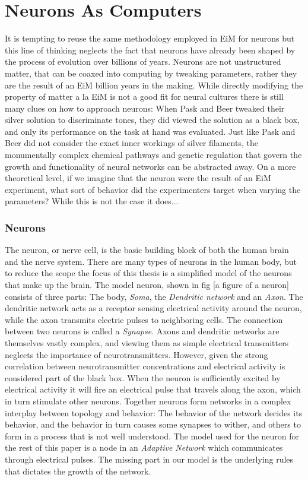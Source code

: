 \section{Neurons As Computers}
It is tempting to reuse the same methodology employed in EiM for neurons but
this line of thinking neglects the fact that neurons have already been shaped by
the process of evolution over billions of years.
Neurons are not unstructured matter, that can be coaxed into computing by
tweaking parameters, rather they are the result of an EiM billion years in the
making.
While directly modifying the property of matter a la EiM is not a good fit for
neural cultures there is still many clues on how to approach neurons:
When Pask and Beer tweaked their silver solution to discriminate tones, they did
viewed the solution as a black box, and only its performance on the task at hand
was evaluated.
Just like Pask and Beer did not consider the exact inner workings of silver
filaments, the monumentally complex chemical pathways and genetic regulation
that govern the growth and functionality of neural networks can be abstracted
away.
On a more theoretical level, if we imagine that the neuron were the result of an
EiM experiment, what sort of behavior did the experimenters target when varying
the parameters?
While this is not the case it does...

\subsubsection{Neurons}
The neuron, or nerve cell, is the basic building block of both the human brain
and the nerve system.
There are many types of neurons in the human body, but to reduce the scope the
focus of this thesis is a simplified model of the neurons that make up the
brain.
The model neuron, shown in fig [a figure of a neuron] consists of three parts:
The body, \emph{Soma}, the \emph{Dendritic network} and an \emph{Axon}.
The dendritic network acts as a receptor sensing electrical activity around the
neuron, while the axon transmits electric pulses to neighboring cells.
The connection between two neurons is called a \emph{Synapse}.
Axons and dendritic networks are themselves vastly complex, and viewing them as
simple electrical transmitters neglects the importance of neurotransmitters.
However, given the strong correlation between neurotransmitter concentrations and
electrical activity is considered part of the black box.
When the neuron is sufficiently excited by electrical activity it will fire an
electrical pulse that travels along the axon, which in turn stimulate other
neurons.
Together neurons form networks in a complex interplay between topology and behavior:
The behavior of the network decides its behavior, and the behavior in turn
causes some synapses to wither, and others to form in a process that is not well
understood.
The model used for the neuron for the rest of this paper is a node in an
\emph{Adaptive Network} which communicates through electrical pulses.
The missing part in our model is the underlying rules that dictates the growth
of the network.


